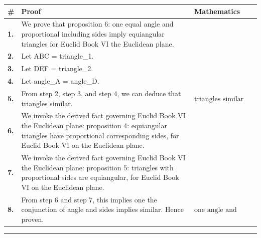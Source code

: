 \documentclass[11pt]{article}
\theoremstyle{definition}
\begin{document}
\begin{tabular}{@{} >{\raggedright\arraybackslash}p{} >{\raggedright\arraybackslash}p{} >{\raggedleft\arraybackslash}p{} @{}}
\textbf{\#} & \textbf{Proof} & \textbf{Mathematics} \\
\midrule
\textbf{1.} & We prove that proposition 6: one equal angle and proportional including sides imply equiangular triangles for Euclid Book VI the Euclidean plane. & \\[0.45em]
\textbf{2.} & Let ABC = triangle\_1. & \\[0.45em]
\textbf{3.} & Let DEF = triangle\_2. & \\[0.45em]
\textbf{4.} & Let angle\_A = angle\_D. & \\[0.45em]
\textbf{5.} & From step 2, step 3, and step 4, we can deduce that triangles similar. & $\displaystyle \text{triangles similar}$ \\[0.45em]
\textbf{6.} & We invoke the derived fact governing Euclid Book VI the Euclidean plane: proposition 4: equiangular triangles have proportional corresponding sides, for Euclid Book VI on the Euclidean plane. & \\[0.45em]
\textbf{7.} & We invoke the derived fact governing Euclid Book VI the Euclidean plane: proposition 5: triangles with proportional sides are equiangular, for Euclid Book VI on the Euclidean plane. & \\[0.45em]
\textbf{8.} & From step 6 and step 7, this implies one the conjunction of angle and sides implies similar. Hence proven. & $\displaystyle \text{one angle and sides implies similar}$ \\[0.45em]
\bottomrule
\end{tabular}
\label{thm:Geometry-Euclid Book VI-proposition_6_one_equal_angle_and_proportional_including_sides_imply_equiangular_triangles}
\par\medskip\hrule
\end{document}
